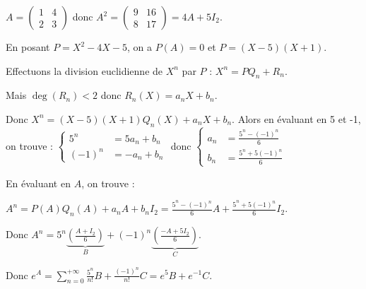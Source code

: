 \begin{exemple}
    \lvspace $A = \begin{pmatrix}
        1 & 4 \\
        2 & 3
    \end{pmatrix}$ donc $A^2 = \begin{pmatrix}
        9 & 16 \\
        8 & 17
    \end{pmatrix} = 4A + 5 I_2$. 

    En posant $P = X^2 - 4X - 5$, on a $P(A) = 0$ et $P = (X - 5)(X + 1)$.

    Effectuons la division euclidienne de $X^n$ par $P$ : $X^n = P Q_n + R_n$. 
    
    Mais $\deg(R_n) < 2$ donc $R_n(X) = a_n X + b_n$. 

    Donc $X^n = (X - 5)(X + 1) Q_n(X) + a_n X + b_n$. Alors en évaluant en 5 et -1, on trouve :
    $\left\{ \begin{array}{rl}
        5^n & = 5 a_n + b_n \\
        (-1)^n & = -a_n + b_n
    \end{array} \right.$ donc $\left\{ \begin{array}{rl}
        a_n & = \frac{5^n - (-1)^n}{6} \\
        b_n & = \frac{5^{n} + 5(-1)^n}{6}
    \end{array} \right.$

    En évaluant en $A$, on trouve :
    
    $A^n = P(A) Q_n(A) + a_n A + b_n I_2 = \frac{5^n - (-1)^n}{6} A + \frac{5^n + 5(-1)^n}{6} I_2$.

    Donc $A^n = 5^n \underbrace{\left( \frac{A + I_2} 6 \right)}_{B} + (-1)^n \underbrace{\left( \frac{-A + 5 I_2}{6} \right)}_{C}$.

    Donc $\displaystyle e^A = \sum_{n = 0}^{+\infty} \frac{5^n}{n!}B + \frac{(-1)^n}{n!} C = e^5 B + e^{-1} C$. \\
\end{exemple}

